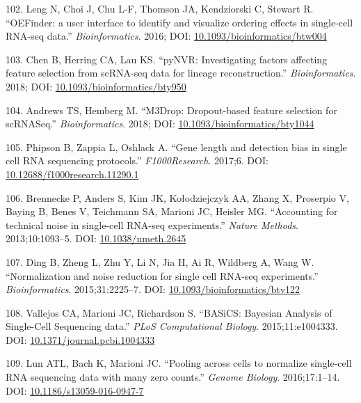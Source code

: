 \documentclass[11pt,a4paper,titlepage,twoside,openright]{style/unimelbthesis}
\theoremstyle{definition}
\theoremstyle{definition}
\theoremstyle{definition}
\theoremstyle{remark}
\begin{document}
\begin{mainmatter}
\leavevmode\hypertarget{ref-Leng2016-it}{}%
102. Leng N, Choi J, Chu L-F, Thomson JA, Kendziorski C, Stewart R. ``OEFinder: a user interface to identify and visualize ordering effects in single-cell RNA-seq data.'' \emph{Bioinformatics}. 2016; DOI: \href{https://doi.org/10.1093/bioinformatics/btw004}{10.1093/bioinformatics/btw004}

\leavevmode\hypertarget{ref-Chen2018-ug}{}%
103. Chen B, Herring CA, Lau KS. ``pyNVR: Investigating factors affecting feature selection from scRNA-seq data for lineage reconstruction.'' \emph{Bioinformatics}. 2018; DOI: \href{https://doi.org/10.1093/bioinformatics/bty950}{10.1093/bioinformatics/bty950}

\leavevmode\hypertarget{ref-Andrews2018-xa}{}%
104. Andrews TS, Hemberg M. ``M3Drop: Dropout-based feature selection for scRNASeq.'' \emph{Bioinformatics}. 2018; DOI: \href{https://doi.org/10.1093/bioinformatics/bty1044}{10.1093/bioinformatics/bty1044}

\leavevmode\hypertarget{ref-Phipson2017-qt}{}%
105. Phipson B, Zappia L, Oshlack A. ``Gene length and detection bias in single cell RNA sequencing protocols.'' \emph{F1000Research}. 2017;6. DOI: \href{https://doi.org/10.12688/f1000research.11290.1}{10.12688/f1000research.11290.1}

\leavevmode\hypertarget{ref-Brennecke2013-pt}{}%
106. Brennecke P, Anders S, Kim JK, Kołodziejczyk AA, Zhang X, Proserpio V, Baying B, Benes V, Teichmann SA, Marioni JC, Heisler MG. ``Accounting for technical noise in single-cell RNA-seq experiments.'' \emph{Nature Methods}. 2013;10:1093--5. DOI: \href{https://doi.org/10.1038/nmeth.2645}{10.1038/nmeth.2645}

\leavevmode\hypertarget{ref-Ding2015-ht}{}%
107. Ding B, Zheng L, Zhu Y, Li N, Jia H, Ai R, Wildberg A, Wang W. ``Normalization and noise reduction for single cell RNA-seq experiments.'' \emph{Bioinformatics}. 2015;31:2225--7. DOI: \href{https://doi.org/10.1093/bioinformatics/btv122}{10.1093/bioinformatics/btv122}

\leavevmode\hypertarget{ref-Vallejos2015-ef}{}%
108. Vallejos CA, Marioni JC, Richardson S. ``BASiCS: Bayesian Analysis of Single-Cell Sequencing data.'' \emph{PLoS Computational Biology}. 2015;11:e1004333. DOI: \href{https://doi.org/10.1371/journal.pcbi.1004333}{10.1371/journal.pcbi.1004333}

\leavevmode\hypertarget{ref-Lun2016-mq}{}%
109. Lun ATL, Bach K, Marioni JC. ``Pooling across cells to normalize single-cell RNA sequencing data with many zero counts.'' \emph{Genome Biology}. 2016;17:1--14. DOI: \href{https://doi.org/10.1186/s13059-016-0947-7}{10.1186/s13059-016-0947-7}


\end{mainmatter}
\end{document}
